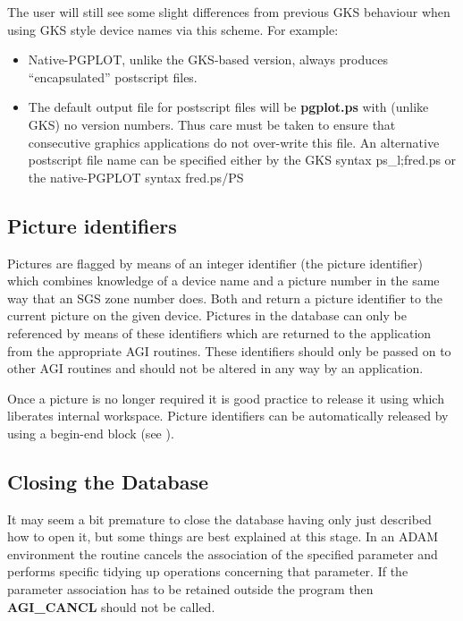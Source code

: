 \documentclass[twoside,11pt]{starlink}
\begin{document}
The user will still see some slight differences from previous GKS behaviour
when using GKS style device names via this scheme. For example:
\begin{itemize}
\item Native-PGPLOT, unlike the GKS-based version, always produces
``encapsulated'' postscript files.
\item The default output file for postscript files will be \textbf{pgplot.ps}
with (unlike GKS) no version numbers.  Thus care must be taken to ensure
that consecutive graphics applications do not over-write this file. An
alternative postscript file name can be specified either by the GKS
syntax ps\_l;fred.ps or the native-PGPLOT syntax fred.ps/PS
\end{itemize}

\subsection{Picture identifiers}

Pictures are flagged by means of an integer identifier (the picture
identifier) which combines knowledge of a device name and a picture
number in the same way that an SGS zone number does. Both
and
return a picture identifier to the current picture on
the given device. Pictures in the database can only be referenced by means
of these identifiers which are returned to the application from the
appropriate AGI routines. These identifiers should only be passed on to
other AGI routines and should not be altered in any way by an application.

Once a picture is no longer required it is good practice to release it using
 which liberates internal workspace. Picture identifiers
can be automatically released by using a begin-end block (see
).

\subsection{Closing the Database}

It may seem a bit premature to close the database having only just
described how to open it, but some things are best explained at this stage.
In an ADAM environment the routine
 cancels the
association of the specified parameter and performs specific tidying
up operations concerning that parameter. If the parameter association
has to be retained outside the program then \textbf{AGI\_CANCL} should not
be called.
\end{document}
